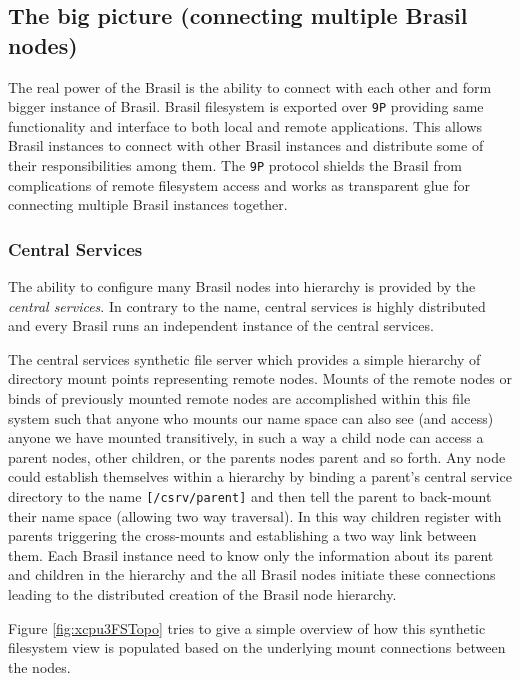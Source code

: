 \documentclass[conference]{sig-alternate}
\begin{document}
\subsection{The big picture (connecting multiple Brasil nodes)}
The real power of the Brasil is the ability to connect with each other and form
bigger instance of Brasil.  Brasil filesystem is exported over \texttt{9P}
providing same functionality and interface to both local and remote
applications.  This allows Brasil instances to connect with other Brasil
instances and distribute some of their responsibilities among them.
The \texttt{9P} protocol shields the Brasil from complications of remote
filesystem access and works as transparent glue for connecting multiple Brasil
instances together.

\subsubsection{Central Services}

The ability to configure many Brasil nodes into hierarchy is provided by the
\textit{central services}.  In contrary to the name, central services is
highly distributed and every Brasil runs an independent instance of the central
services.  


The central services synthetic file server which provides a simple hierarchy of
directory mount points representing remote nodes.  Mounts of the remote nodes
or binds of previously mounted remote nodes are accomplished within this file
system such that anyone who mounts our name space can also see (and
access) anyone we have mounted transitively,  in such a way a child
node can access a parent nodes, other children, or the parents nodes
parent and so forth. Any node could establish themselves within a
hierarchy by binding a parent's central service directory to the name
\texttt{[/csrv/parent]} and then tell the parent to back-mount their name space
(allowing two way traversal).  In this way children register with parents
triggering the cross-mounts and establishing a two way link between them. Each
Brasil instance need to know only the information about its parent and children
in the hierarchy and the all Brasil nodes initiate these connections leading to
the distributed creation of the Brasil node hierarchy.
 
Figure \ref{fig:xcpu3FSTopo} tries to give a simple overview of how this 
synthetic filesystem view is populated based on the underlying mount
connections between the nodes.
\end{document}
